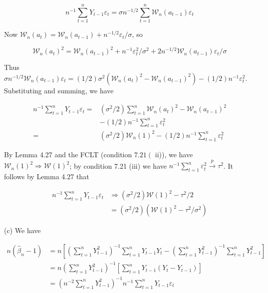 \documentclass[10pt]{article}
\begin{document}
$$
n^{-1} \sum_{t=1}^{n} Y_{t-1} \varepsilon_{t}=\sigma n^{-1 / 2} \sum_{t=1}^{n} \mathcal{W}_{n}\left(a_{t-1}\right) \varepsilon_{t}
$$

Now $\mathcal{W}_{n}\left(a_{t}\right)=\mathcal{W}_{n}\left(a_{t-1}\right)+n^{-1 / 2} \varepsilon_{t} / \sigma$, so

$$
\mathcal{W}_{n}\left(a_{t}\right)^{2}=\mathcal{W}_{n}\left(a_{t-1}\right)^{2}+n^{-1} \varepsilon_{t}^{2} / \sigma^{2}+2 n^{-1 / 2} \mathcal{W}_{n}\left(a_{t-1}\right) \varepsilon_{t} / \sigma
$$

Thus $\sigma n^{-1 / 2} \mathcal{W}_{n}\left(a_{t-1}\right) \varepsilon_{t}=(1 / 2) \sigma^{2}\left(\mathcal{W}_{n}\left(a_{t}\right)^{2}-\mathcal{W}_{n}\left(a_{t-1}\right)^{2}\right)-(1 / 2) n^{-1} \varepsilon_{t}^{2}$. Substituting and summing, we have

$$
\begin{aligned}
n^{-1} \sum_{t=1}^{n} Y_{t-1} \varepsilon_{t}= & \left(\sigma^{2} / 2\right) \sum_{t=1}^{n} \mathcal{W}_{n}\left(a_{t}\right)^{2}-\mathcal{W}_{n}\left(a_{t-1}\right)^{2} \\
& -(1 / 2) n^{-1} \sum_{t=1}^{n} \varepsilon_{t}^{2} \\
= & \left(\sigma^{2} / 2\right) \mathcal{W}_{n}(1)^{2}-(1 / 2) n^{-1} \sum_{t=1}^{n} \varepsilon_{t}^{2}
\end{aligned}
$$

By Lemma 4.27 and the FCLT (condition $7.21\left(\right.$ ii)), we have $\mathcal{W}_{n}(1)^{2} \Rightarrow \mathcal{W}(1)^{2}$; by condition 7.21 (iii) we have $n^{-1} \sum_{t=1}^{n} \varepsilon_{t}^{2} \xrightarrow{p} \tau^{2}$. It follows by Lemma 4.27 that

$$
\begin{aligned}
n^{-1} \sum_{t=1}^{n} Y_{t-1} \varepsilon_{t} & \Rightarrow\left(\sigma^{2} / 2\right) \mathcal{W}(1)^{2}-\tau^{2} / 2 \\
& =\left(\sigma^{2} / 2\right)\left(\mathcal{W}(1)^{2}-\tau^{2} / \sigma^{2}\right)
\end{aligned}
$$

(c) We have

$$
\begin{aligned}
n\left(\hat{\beta}_{n}-1\right) & =n\left[\left(\sum_{t=1}^{n} Y_{t-1}^{2}\right)^{-1} \sum_{t=1}^{n} Y_{t-1} Y_{t}-\left(\sum_{t=1}^{n} Y_{t-1}^{2}\right)^{-1} \sum_{t=1}^{n} Y_{t-1}^{2}\right] \\
& =n\left(\sum_{t=1}^{n} Y_{t-1}^{2}\right)^{-1}\left[\sum_{t=1}^{n} Y_{t-1}\left(Y_{t}-Y_{t-1}\right)\right] \\
& =\left(n^{-2} \sum_{t=1}^{n} Y_{t-1}^{2}\right)^{-1} n^{-1} \sum_{t=1}^{n} Y_{t-1} \varepsilon_{t}
\end{aligned}
$$
\end{document}
